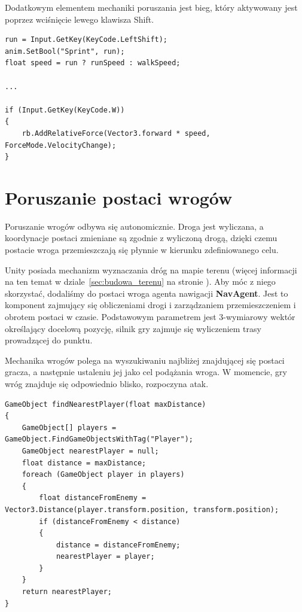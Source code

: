 \documentclass[openright]{xmgr}
\newcommand{\name}[1]{\textbf{\textcolor{NavyBlue}{#1}}}
\begin{document}
      Dodatkowym elementem mechaniki poruszania jest bieg, który aktywowany jest poprzez wciśnięcie lewego klawisza Shift.

\begin{minipage}{\textwidth}
\begin{lstlisting}[caption={Fragment kodu mechaniki biegania -- reakcja na wciśnięcie klawisza \name{W}}]
run = Input.GetKey(KeyCode.LeftShift);
anim.SetBool("Sprint", run);
float speed = run ? runSpeed : walkSpeed;

...

if (Input.GetKey(KeyCode.W))
{
    rb.AddRelativeForce(Vector3.forward * speed, ForceMode.VelocityChange);
}
\end{lstlisting}
\end{minipage}

  \section{Poruszanie postaci wrogów}\label{sec:poruszanie_wrogow}

    Poruszanie wrogów odbywa się autonomicznie. Droga jest wyliczana, a koordynacje postaci zmieniane są zgodnie z wyliczoną drogą, dzięki czemu postacie wroga przemieszczają się płynnie w kierunku zdefiniowanego celu.

    Unity posiada mechanizm wyznaczania dróg na mapie terenu (więcej informacji na ten temat w dziale~\ref{sec:budowa_terenu} na stronie \pageref{sec:budowa_terenu}). Aby móc z niego skorzystać, dodaliśmy do postaci wroga agenta nawigacji \name{NavAgent}. Jest to komponent zajmujący się obliczeniami drogi i zarządzaniem przemieszczeniem i obrotem postaci w czasie. Podstawowym parametrem jest 3-wymiarowy wektór określający docelową pozycję, silnik gry zajmuje się wyliczeniem trasy prowadzącej do punktu.

    Mechanika wrogów polega na wyszukiwaniu najbliżej znajdującej się postaci gracza, a następnie ustaleniu jej jako cel podążania wroga. W momencie, gry wróg znajduje się odpowiednio blisko, rozpoczyna atak.

\begin{minipage}{\textwidth}
\begin{lstlisting}[caption={Algorytm zwracający wskaźnik do obiektu znajdującego się najbliżej, przy określonym maksymalnym promieniu poszukiwań}]
GameObject findNearestPlayer(float maxDistance)
{
    GameObject[] players = GameObject.FindGameObjectsWithTag("Player");
    GameObject nearestPlayer = null;
    float distance = maxDistance;
    foreach (GameObject player in players)
    {
        float distanceFromEnemy = Vector3.Distance(player.transform.position, transform.position);
        if (distanceFromEnemy < distance)
        {
            distance = distanceFromEnemy;
            nearestPlayer = player;
        }
    }
    return nearestPlayer;
}
\end{lstlisting}
\end{minipage}
\end{document}
